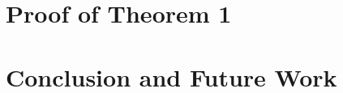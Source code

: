 \documentclass{article} %
\begin{document}
\section{Proof of Theorem 1}

\section{Conclusion and Future Work}



\end{document}
